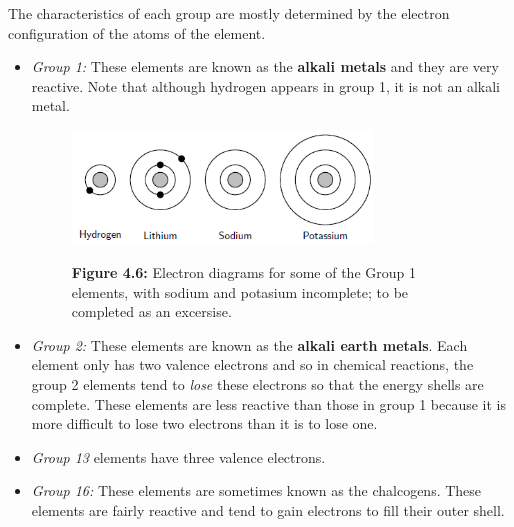         \label{m38757*id261577}The characteristics of each group are mostly determined by the electron configuration of the atoms of the element.\par 
        \label{m38757*id261581}\begin{itemize}[noitemsep]
            \label{m38757*uid135}\item \textsl{Group 1:} These elements are known as the \textbf{alkali metals} and they are very reactive. Note that although hydrogen appears in group 1, it is not an alkali metal.
    \setcounter{subfigure}{0}
	\begin{figure}[H] %
    \begin{center}
    \label{m38757*uid139!!!underscore!!!media}\label{m38757*uid139!!!underscore!!!printimage}\includegraphics[width=8cm]{col11305.imgs/m38757_CG10C3_015.png} %
      \vspace{2pt}
    \vspace{\rubberspace}\par \begin{cnxcaption}
	  \small \textbf{Figure 4.6: }Electron diagrams for some of the Group 1 elements, with sodium and potasium incomplete; to be completed as an excersise.
	\end{cnxcaption}
    \vspace{.1in}
    \end{center}
 \end{figure}       \label{m38757*uid140}\item \textsl{Group 2:} These elements are known as the \textbf{alkali earth metals}. Each element only has two valence electrons and so in chemical reactions, the group 2 elements tend to \textsl{lose} these electrons so that the energy shells are complete. These elements are less reactive than those in group 1 because it is more difficult to lose two electrons than it is to lose one.
\label{m38757*uid141}\item \textsl{Group 13} elements have three valence electrons.
\label{m38757*id6232}\item \textsl{Group 16:} These elements are sometimes known as the chalcogens. These elements are fairly reactive and tend to gain electrons to fill their outer shell.

\end{itemize}
